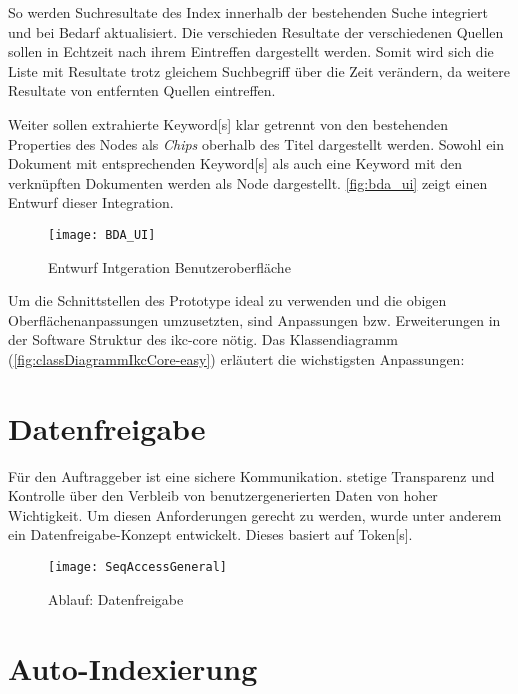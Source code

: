 So werden Suchresultate des Index innerhalb der bestehenden Suche integriert und bei Bedarf aktualisiert. Die verschieden Resultate der verschiedenen Quellen sollen in Echtzeit nach ihrem Eintreffen dargestellt werden. Somit wird sich die Liste mit Resultate trotz gleichem Suchbegriff über die Zeit verändern, da weitere Resultate von entfernten Quellen eintreffen. 

Weiter sollen extrahierte \gls{Keyword}[s] klar getrennt von den bestehenden Properties des Nodes als \textit{Chips} oberhalb des Titel dargestellt werden. Sowohl ein Dokument mit entsprechenden \gls{Keyword}[s] als auch eine \gls{Keyword} mit den verknüpften Dokumenten werden als Node dargestellt. \autoref{fig:bda_ui} zeigt einen Entwurf dieser Integration. 

    \begin{figure}[H]
    \centering
    \texttt{[image: BDA\_UI]}
    \caption{Entwurf Intgeration Benutzeroberfläche}
    \label{fig:bda_ui}
    \end{figure}

Um die Schnittstellen des Prototype ideal zu verwenden und die obigen Oberflächenanpassungen umzusetzten, sind Anpassungen bzw. Erweiterungen in der Software Struktur des \gls{ikc-core} nötig. Das Klassendiagramm (\autoref{fig:classDiagrammIkcCore-easy}) erläutert die wichstigsten Anpassungen:


\section{Datenfreigabe}
Für den Auftraggeber ist eine sichere Kommunikation. stetige Transparenz und Kontrolle über den Verbleib von benutzergenerierten Daten von hoher Wichtigkeit. Um diesen Anforderungen gerecht zu werden, wurde unter anderem ein Datenfreigabe-Konzept entwickelt. Dieses basiert auf \gls{Token}[s]. 







    \begin{figure}[H]
    \centering
    \texttt{[image: SeqAccessGeneral]}
    \caption{Ablauf: Datenfreigabe}
    \label{fig:seqaccesssession-easy}
    \end{figure}



\section{Auto-Indexierung}
